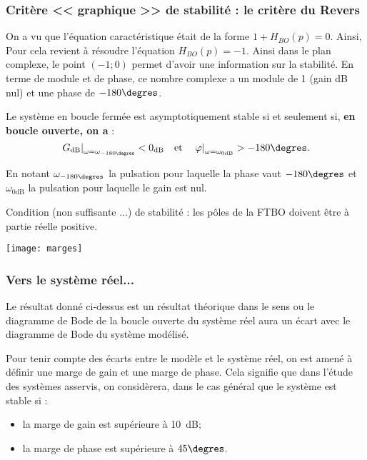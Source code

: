\subsubsection{Critère << graphique >> de stabilité : le critère du Revers}

 
 On a vu que l'équation caractéristique était de la forme $1+H_{BO}(p)=0$. Ainsi, Pour cela revient à résoudre l'équation $H_{BO}(p)=-1$. Ainsi dans le plan complexe, le point $(-1;0)$ permet d'avoir une information sur la stabilité. En terme de module et de phase, ce nombre complexe a un module de 1 (gain dB nul) et une phase de $-180\degres$.
 
\begin{resultat}
Le système en boucle fermée est asymptotiquement stable si et seulement si, \textbf{en boucle ouverte, on a} :
$$
\left. G_{\text{dB}} \right|_{\omega=\omega_{-180\degres}}<0_{\text{dB}} 
\quad
\text{et}
\quad
\left. \varphi \right|_{\omega=\omega_{0\text{dB}}}>-180\degres.
$$

En notant $\omega_{-180\degres}$ la pulsation pour laquelle la phase vaut $-180\degres$ et $\omega_{0\text{dB}}$ la pulsation pour laquelle le gain est nul.
\end{resultat}
 
 
\begin{resultat}
Condition (non suffisante ...) de stabilité : les pôles de la FTBO doivent être à partie réelle positive.
\end{resultat}
 
\begin{center}
\texttt{[image: marges]}
\end{center} 
\subsubsection{Vers le système réel...}

Le résultat donné ci-dessus est un résultat théorique dans le sens ou le diagramme de Bode de la boucle ouverte du système réel aura un écart avec le diagramme de Bode du système modélisé. 


\begin{resultat}[Marges]
Pour tenir compte des écarts entre le modèle et le système réel, on est amené à définir une marge de gain et une marge de phase. Cela signifie que dans l'étude des systèmes asservis, on considèrera, dans le cas général que le système est stable si :
\begin{itemize}
\item la marge de gain est supérieure à \SI{10}{dB};
\item la marge de phase est supérieure à $45\degres$.
\end{itemize}
\end{resultat}

